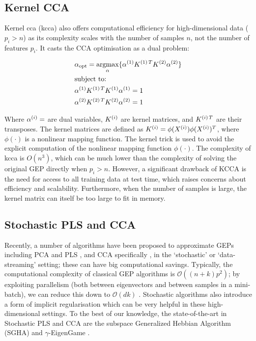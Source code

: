 \subsection{Kernel CCA}

Kernel \acrshort{cca} (\acrshort{kcca}) also offers computational efficiency for high-dimensional data (\(p_i>n\)) as its complexity scales with the number of samples \(n\), not the number of features \(p_i\)\citep{akaho2006kernel}.
It casts the CCA optimisation as a dual problem:

\begin{align}
    & \alpha_{\text{opt}}=\underset{\alpha}{\mathrm{argmax}}\{ \alpha^{(1)}K^{(1)\,T}K^{(2)}\alpha^{(2)}  \} \\
    & \text{subject to:} \notag                                                                                            \\
    & \alpha^{(1)}K^{(1)\,T}K^{(1)}\alpha^{(1)}=1 \notag                                                                  \\
    & \alpha^{(2)}K^{(2)\,T}K^{(2)}\alpha^{(2)}=1 \notag
\end{align}

Where \(\alpha^{(i)}=\) are dual variables, \(K^{(i)}\) are kernel matrices, and \(K^{(i)\,T}\) are their transposes.
The kernel matrices are defined as \(K^{(i)}=\phi(X^{(i)})\phi(X^{(i)})^T\), where \(\phi(\cdot)\) is a nonlinear mapping function.
The kernel trick is used to avoid the explicit computation of the nonlinear mapping function \(\phi(\cdot)\).
The complexity of \acrshort{kcca} is \(O(n^3)\), which can be much lower than the complexity of solving the original GEP directly when \(p_i>n\).
However, a significant drawback of KCCA is the need for access to all training data at test time, which raises concerns about efficiency and scalability.
Furthermore, when the number of samples is large, the kernel matrix can itself be too large to fit in memory.

\subsection{Stochastic PLS and CCA}
Recently, a number of algorithms have been proposed to approximate GEPs including PCA and PLS \citep{arora2012stochastic}, and CCA specifically \citep{bhatia2018gen}, in the `stochastic' or `data-streaming' setting; these can have big computational savings.
Typically, the computational complexity of classical GEP algorithms is $\mathcal{O}\left((n + k)p^2\right)$; by exploiting parallelism (both between eigenvectors and between samples in a mini-batch), we can reduce this down to $\mathcal{O}\left(d k \right)$ \citep{arora2016stochastic}.
Stochastic algorithms also introduce a form of implicit regularisation \citep{smith2021origin} which can be very helpful in these high-dimensional settings.
To the best of our knowledge, the state-of-the-art in Stochastic PLS and CCA are the subspace Generalized Hebbian Algorithm (SGHA) \citep{chen2019constrained} and $\gamma$-EigenGame \citep{gemp20,gemp2021}.
